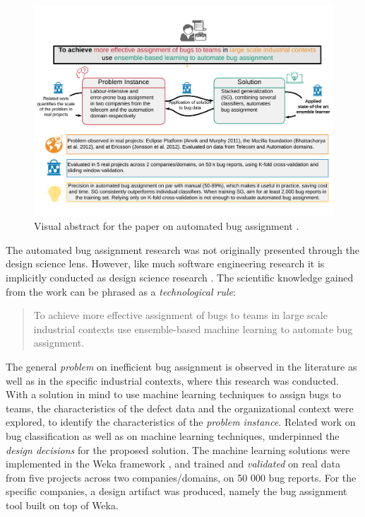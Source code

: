 \documentclass[graybox]{svmult}
\begin{document}
\begin{figure}[t]
\begin{center}
\includegraphics[width=\columnwidth, trim={7mm 30mm 7mm 30mm },clip]{Figures/VATemplateJonsson.pdf}
\caption{Visual abstract for the paper on automated bug assignment \cite{JonssonBug15}.}
\label{fig:BugAssignment}
\end{center}
\end{figure}

The automated bug assignment research was not originally presented through the design science lens. However, like much software engineering research it is implicitly conducted as design science research \cite{Engstrom19arxiv}. 
The scientific knowledge gained from the work can be phrased as a \emph{technological rule}:
\begin{quote}{To achieve more effective assignment of bugs to teams in large scale industrial contexts use ensemble-based machine learning to automate bug assignment. \cite{StoreyESEM17}}\end{quote}

The general \emph{problem} on inefficient bug assignment is observed in the literature as well as in the specific industrial contexts, where this research was conducted. With a solution in mind to use machine learning techniques to assign bugs to teams, the characteristics of the defect data and the organizational context were explored, to identify the characteristics of the \emph{problem instance}. Related work on bug classification as well as on machine learning techniques, underpinned the \emph{design decisions} for the proposed solution. The machine learning solutions were implemented in the Weka framework \cite{hall_weka_2009}, and trained and \emph{validated} on real data from five projects across two companies/domains, on 50 000 bug reports. For the specific companies, a design artifact was produced, namely the bug assignment tool built on top of Weka.
\end{document}
